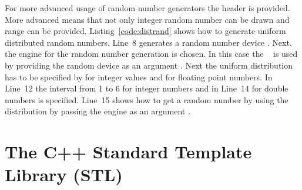 

For more advanced usage of random number generators the  header is provided. More advanced means that not only integer random number can be drawn and range can be provided. Listing~\ref{code:distrand} shows how to generate uniform distributed random numbers. Line~8 generates a random number device . Next, the engine for the random number generation is chosen. In this case the ~\cite{matsumoto1998mersenne} is used by providing the random device as an argument . Next the uniform distribution has to be specified by  for integer values and  for floating point numbers. In Line~12 the interval from 1 to 6 for integer numbers and in Line~14 for double numbers is specified. Line~15 shows how to get a random number by using the distribution by passing the engine as an argument .



\theendnotes

\chapter{The C++ Standard Template Library (STL)}
\label{chapter:stl}


